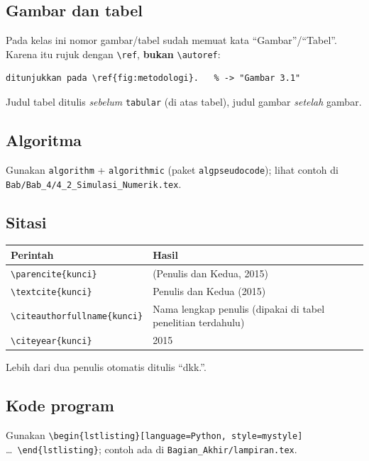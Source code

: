 \documentclass[11pt,a4paper]{article}
\newcommand{\cmd}[1]{\texttt{\textbackslash #1}}
\newcommand{\file}[1]{\texttt{#1}}
\begin{document}
\subsection*{Gambar dan tabel}
Pada kelas ini nomor gambar/tabel sudah memuat kata ``Gambar''/``Tabel''. Karena itu rujuk dengan \cmd{ref}, \textbf{bukan} \cmd{autoref}:
\begin{lstlisting}
ditunjukkan pada \ref{fig:metodologi}.   % -> "Gambar 3.1"
\end{lstlisting}
Judul tabel ditulis \emph{sebelum} \texttt{tabular} (di atas tabel), judul gambar \emph{setelah} gambar.

\subsection*{Algoritma}
Gunakan \texttt{algorithm} + \texttt{algorithmic} (paket \texttt{algpseudocode}); lihat contoh di \file{Bab/Bab\_4/4\_2\_Simulasi\_Numerik.tex}.

\subsection*{Sitasi}
\begin{longtable}{@{}p{6cm}p{9cm}@{}}
\toprule
\textbf{Perintah} & \textbf{Hasil} \\ \midrule
\verb|\parencite{kunci}| & (Penulis dan Kedua, 2015) \\
\verb|\textcite{kunci}| & Penulis dan Kedua (2015) \\
\verb|\citeauthorfullname{kunci}| & Nama lengkap penulis (dipakai di tabel penelitian terdahulu) \\
\verb|\citeyear{kunci}| & 2015 \\
\bottomrule
\end{longtable}
Lebih dari dua penulis otomatis ditulis ``dkk.''.

\subsection*{Kode program}
Gunakan \verb|\begin{lstlisting}[language=Python, style=mystyle]| \dots\ \verb|\end{lstlisting}|; contoh ada di \file{Bagian\_Akhir/lampiran.tex}.
\end{document}
